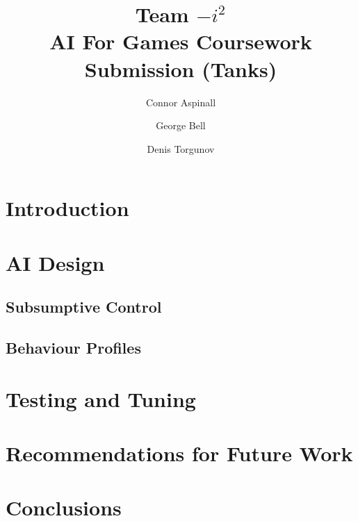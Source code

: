 \documentclass[11pt]{article}
\title{Team \(-i^2\)\\
AI For Games Coursework Submission (Tanks)}
\author{Connor Aspinall \and George Bell \and Denis Torgunov}
\date{}
\begin{document}
\maketitle
\tableofcontents
\thispagestyle{empty}

\newpage

\section{Introduction}
\section{AI Design}
\subsection{Subsumptive Control}
\subsection{Behaviour Profiles}
\section{Testing and Tuning}
\section{Recommendations for Future Work}
\section{Conclusions}
\end{document}
